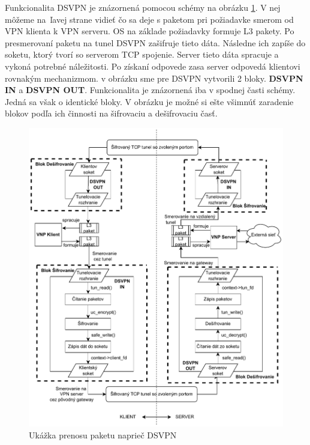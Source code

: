 Funkcionalita DSVPN je znázornená pomocou schémy na obrázku \ref{dsvpnarch}. V nej môžeme na~ľavej strane vidieť čo sa deje s paketom pri požiadavke smerom od VPN klienta k VPN serveru. OS na základe požiadavky formuje L3 pakety. Po presmerovaní paketu na tunel DSVPN zašifruje tieto dáta. Následne ich zapíše do soketu, ktorý tvorí so serverom TCP spojenie. Server tieto dáta spracuje a vykoná potrebné náležitosti. Po získaní odpovede zasa server odpovedá klientovi rovnakým mechanizmom. v obrázku sme pre DSVPN vytvorili 2 bloky. \textbf{DSVPN IN} a \textbf{DSVPN OUT}. Funkcionalita je znázornená iba v spodnej časti schémy. Jedná sa však o identické bloky. V obrázku je možné si ešte všimnúť zaradenie blokov podľa ich činnosti na šifrovaciu a dešifrovaciu časť. 
\begin{figure}[h!]
	\centering
	\includegraphics[width=1.1\textwidth]{figures/dsvpn.pdf}
	\caption{Ukážka prenosu paketu naprieč DSVPN}
	\label{dsvpnarch}
\end{figure}


 
